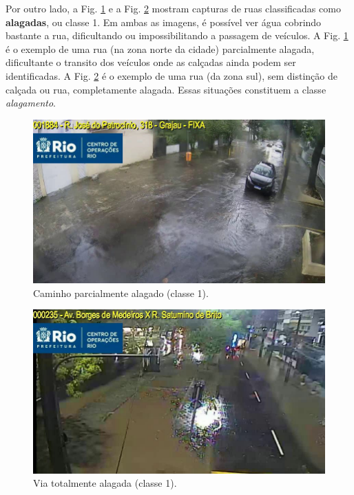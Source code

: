 Por outro lado, a Fig. \ref{fig:class1_1} e a Fig. \ref{fig:class1_2} mostram capturas de ruas classificadas como \textbf{alagadas}, ou classe 1. 
Em ambas as imagens, é possível ver água cobrindo bastante a rua, dificultando ou impossibilitando a passagem de veículos. 
A Fig. \ref{fig:class1_1} é o exemplo de uma rua (na zona norte da cidade) parcialmente alagada, dificultante o transito dos veículos onde as calçadas ainda podem ser identificadas. A Fig. \ref{fig:class1_2} é o exemplo de uma rua (da zona sul), sem distinção de calçada ou rua, completamente alagada. Essas situações constituem a classe \textit{alagamento}. 

\begin{figure}[htb]
\centerline{\includegraphics[width=0.8\linewidth]{images/1/CODE1884 2023-08-20 12-56-29-9.jpg}}
\caption{Caminho parcialmente alagado (classe 1).}
\label{fig:class1_1}
\end{figure}

\begin{figure}[htb]
\centerline{\includegraphics[width=0.8\linewidth]{images/1/CODE235 2023-02-07 20-11-08-9.jpg}}
\caption{Via totalmente alagada (classe 1).}
\label{fig:class1_2}
\end{figure}

